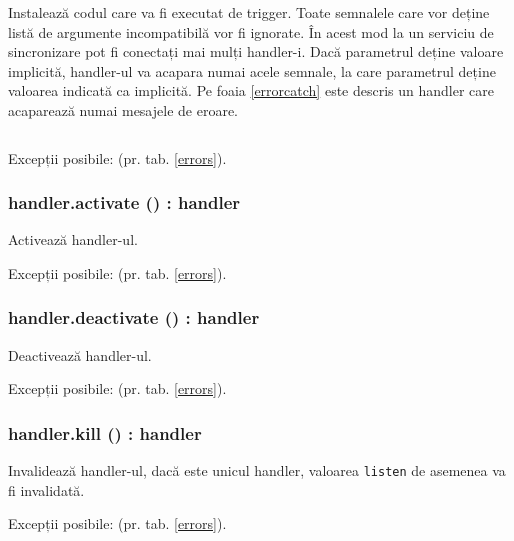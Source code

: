 Instalează codul care va fi executat de trigger. Toate semnalele care vor deține listă de argumente incompatibilă vor fi ignorate. În acest mod la un serviciu de sincronizare pot fi conectați mai mulți handler-i. Dacă parametrul deține valoare implicită, handler-ul va acapara numai acele semnale, la care parametrul deține valoarea indicată ca implicită. Pe foaia \ref{errorcatch} este descris un handler care acaparează numai mesajele de eroare.

\begin{sourcecode}
    \label{errorcatch}
    \inputminted[linenos]{icl}{../sources/errorcatch.icL}
\end{sourcecode}

Excepții posibile:  (pr. tab. \ref{errors}).

\subsubsection{handler.activate () : handler}

Activează handler-ul.

Excepții posibile:  (pr. tab. \ref{errors}).

\subsubsection{handler.deactivate () : handler}

Deactivează handler-ul.

Excepții posibile:  (pr. tab. \ref{errors}).

\subsubsection{handler.kill () : handler}

Invalidează handler-ul, dacă este unicul handler, valoarea \texttt{listen} de asemenea va fi invalidată.

Excepții posibile:  (pr. tab. \ref{errors}).
